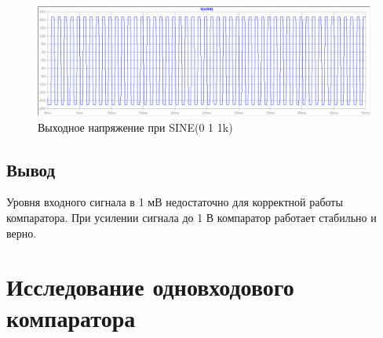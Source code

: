 \documentclass[a4paper, 12pt]{article}
\begin{document}
    \begin{figure}[H]
        \centering
        \includegraphics[scale=0.46]{3task_sine_out_1V_1kf.png}
        \captionsetup{skip=0pt}
        \caption{Выходное напряжение при SINE(0 1 1k)}
        \label{fig:3task_sine_in_1V_1kf}
    \end{figure}


    \subsection{Вывод}
    Уровня входного сигнала в 1 мВ недостаточно для корректной работы компаратора.
    При усилении сигнала до 1 В компаратор работает стабильно и верно.


    \section{Исследование одновходового компаратора}
\end{document}
